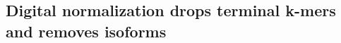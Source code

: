 \documentclass[10pt]{article}
\begin{document}
%
%

\subsection*{Digital normalization drops terminal k-mers and removes isoforms}
\end{document}
